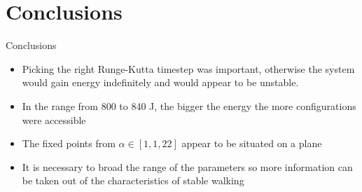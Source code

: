 \documentclass{beamer}
\begin{document}
\section{Conclusions}
\begin{frame}{Conclusions}
  \begin{itemize}    
 \item  Picking the right Runge-Kutta timestep was important, otherwise the system would gain energy indefinitely and would appear to be unstable.
 \item  In the range from 800 to 840 J, the bigger the energy the more configurations were accessible
 \item  The fixed points from $\alpha \in [1,1,22]$ appear to be situated on a plane
   \item It is necessary to broad the range of the parameters so more information can be taken out of the characteristics of stable walking
\end{itemize}
  \end{frame}
\end{document}
